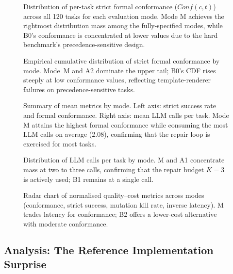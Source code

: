 \begin{figure}[t]
  \centering
  \caption{Distribution of per-task strict formal conformance ($\mathit{Conf}(c,t)$)
    across all 120 tasks for each evaluation mode.  Mode M achieves the rightmost
    distribution mass among the fully-specified modes, while B0's conformance is
    concentrated at lower values due to the hard benchmark's precedence-sensitive
    design.}
  \label{fig:conf-distribution}
\end{figure}

\begin{figure}[t]
  \centering
  \caption{Empirical cumulative distribution of strict formal conformance by mode.
    Mode~M and A2 dominate the upper tail; B0's CDF rises steeply at low conformance
    values, reflecting template-renderer failures on precedence-sensitive tasks.}
  \label{fig:conf-cdf}
\end{figure}

\begin{figure}[t]
  \centering
  \caption{Summary of mean metrics by mode.  Left axis: strict success rate and formal
    conformance.  Right axis: mean LLM calls per task.  Mode M attains the highest
    formal conformance while consuming the most LLM calls on average (2.08), confirming
    that the repair loop is exercised for most tasks.}
  \label{fig:summary-metrics}
\end{figure}

\begin{figure}[t]
  \centering
  \caption{Distribution of LLM calls per task by mode.  M and A1 concentrate mass
    at two to three calls, confirming that the repair budget $K=3$ is actively used;
    B1 remains at a single call.}
  \label{fig:llm-calls}
\end{figure}

\begin{figure}[t]
  \centering
  \caption{Radar chart of normalised quality--cost metrics across modes (conformance,
    strict success, mutation kill rate, inverse latency).  M trades latency for
    conformance; B2 offers a lower-cost alternative with moderate conformance.}
  \label{fig:radar-metrics}
\end{figure}

\subsection{Analysis: The Reference Implementation Surprise}

